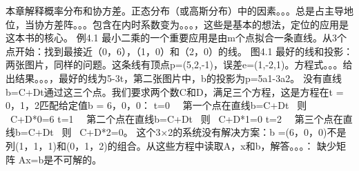 	本章解释概率分布和协方差。正态分布（或高斯分布）中的因素。。。总是占主导地位，当协方差阵。。。包含在内时系数变为。。。，这些是基本的想法，定位的应用是这本书的核心。
	例4.1 最小二乘的一个重要应用是由m个点拟合一条直线。从3个点开始：找到最接近（0，6），（1，0）和（2，0）的线。
	图4.1 最好的线和投影：两张图片，同样的问题。这条线有顶点p=(5,2,-1)，误差e=(1,-2,1)。方程式。。。给出结果。。。，最好的线为5-3t，第二张图片中，b的投影为p=5a1-3a2。
	没有直线b=C+Dt通过这三个点。我们要求两个数C和D，满足三个方程，这是方程在t = 0，1，2匹配给定值b = 6，0，0：
	t=0   第一个点在直线b=C+Dt  则  C+D*0=6 
	t=1   第二个点在直线b=C+Dt  则  C+D*1=0
	t=2   第三个点在直线b=C+Dt  则  C+D*2=0。
	这个3×2的系统没有解决方案：b =(6，0，0)不是列(1，1，1)和(0，1，2)的组合。从这些方程中读取A，x和b，解答。。。：
	缺少矩阵
	Ax=b是不可解的。
